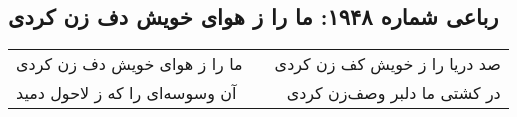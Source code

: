 \begin{center}
\section*{رباعی شماره ۱۹۴۸: ما را ز هوای خویش دف زن کردی}
\label{sec:1948}
\begin{longtable}{l p{0.5cm} r}
ما را ز هوای خویش دف زن کردی
&&
صد دریا را ز خویش کف زن کردی
\\
آن وسوسه‌ای را که ز لاحول دمید
&&
در کشتی ما دلبر وصف‌زن کردی
\\
\end{longtable}
\end{center}

